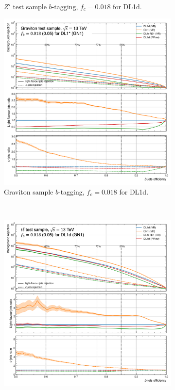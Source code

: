 \begin{figure}
\begin{subfigure}[t]{0.3\textwidth}
    \caption{$Z'$ test sample $b$-tagging, $f_c = 0.018$ for DL1d.}
    \label{fig:dl1dVRROCzp}
  \end{subfigure}
  \hfill
  \begin{subfigure}[t]{0.3\textwidth}
    \centering
    \includegraphics[scale=0.43]{Images/FTAG/VRDL1d/ROC/grb.png}
    \caption{Graviton sample $b$-tagging, $f_c = 0.018$ for DL1d.}
    \label{fig:dl1dVRROCgr}
  \end{subfigure} \\
  \begin{subfigure}[t]{0.3\textwidth}
    \centering
    \includegraphics[scale=0.43]{Images/FTAG/VRDL1d/ROC/ttbupf.png}

\end{subfigure}
\end{figure}
